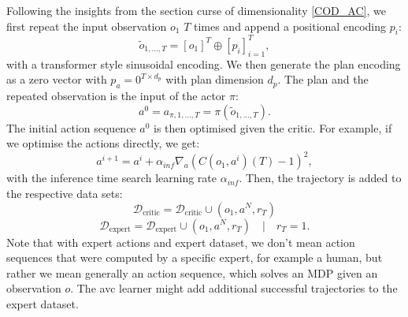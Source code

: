 Following the insights from the section curse of dimensionality \ref{COD_AC}, we first repeat the input observation $o_1$ $T$ times and append a positional encoding $p_i$:
\begin{equation}
    \label{eq:seq_emb}
    \tilde{o}_{1, ..., T} = [o_1]^T \oplus [p_i]_{i=1}^T,
\end{equation}
with a transformer style sinusoidal encoding.
We then generate the plan encoding as a zero vector with $p_a = 0^{T \times d_p}$ with plan dimension $d_p$. The plan and the repeated observation is the input 
of the actor $\pi$:
\begin{equation}
    a^0 = a_{\pi, 1,...,T} = \pi(\tilde{o}_{1, ..., T}).
\end{equation}
The initial action sequence $a^0$ is then optimised given the critic. For example, if we optimise the actions directly, we get:
\begin{equation*}
    a^{i+1} = a^i + \alpha_{inf}\nabla_{a} (C(o_1, a^i)(T) - 1)^2,
\end{equation*}
with the inference time search learning rate $\alpha_{inf}$. Then, the trajectory is added to the respective data sets:
\begin{equation}
    \mathcal{D}_{\text{critic}} = \mathcal{D}_{\text{critic}} \cup (o_1, a^N, r_T)
\end{equation}
\begin{equation*}
    \mathcal{D}_{\text{expert}} = \mathcal{D}_{\text{expert}} \cup (o_1, a^N, r_T)\quad |\quad r_T = 1.
\end{equation*}
Note that with expert actions and expert dataset, we don't mean action sequences that were computed by 
a specific expert, for example a human, but rather we mean generally an action sequence, which solves an MDP given an observation $o$. The \ac{avc} learner might add 
additional successful trajectories to the expert dataset. \\

